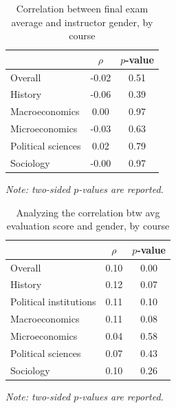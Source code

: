 \documentclass[12pt]{article}
\begin{document}
\begin{table}[htbp]
  \centering
  \footnotesize 
  \caption{Correlation between final exam average and instructor gender, by course}
    \begin{tabular}{lcc}
    \toprule 
                     & $\rho$  & $p$-value    \\
   \midrule
    Overall &            -0.02       & 0.51      \\
    History &            -0.06       & 0.39      \\
    Macroeconomics &      0.00       & 0.97      \\
    Microeconomics &     -0.03       & 0.63      \\
    Political sciences &  0.02       & 0.79      \\
    Sociology &          -0.00       & 0.97      \\
    \bottomrule
    \end{tabular}%
 \label{tab:instructor gender}%
 
  \textit{Note: two-sided $p$-values are reported.}
\end{table}%
\normalsize

\begin{table}[htbp]
  \centering
  \footnotesize 
  \caption{Analyzing the correlation btw avg evaluation score and gender, by course}
    \begin{tabular}{lcc}
    \toprule 
                          & $\rho$  & $p$-value   \\
   \midrule
    Overall &                 0.10       & 0.00     \\
    History &                 0.12       & 0.07     \\
    Political institutions &  0.11       & 0.10     \\
    Macroeconomics &          0.11       & 0.08     \\
    Microeconomics &          0.04       & 0.58     \\
    Political sciences &      0.07       & 0.43      \\
    Sociology &               0.10       & 0.26      \\
    \bottomrule
    \end{tabular}%
 \label{tab:instructor gender}%
  
  \textit{Note: two-sided $p$-values are reported.}
\end{table}%
\normalsize
\end{document}
